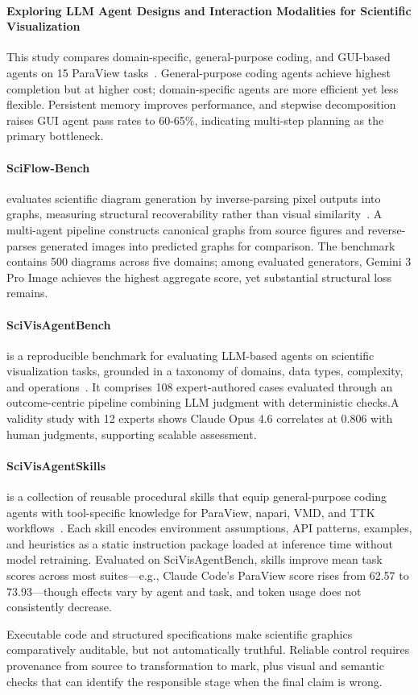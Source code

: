 \paragraph{Exploring LLM Agent Designs and Interaction Modalities for Scientific Visualization}
This study compares domain-specific, general-purpose coding, and GUI-based agents on 15 ParaView tasks~\cite{avg260427996}. General-purpose coding agents achieve highest completion but at higher cost; domain-specific agents are more efficient yet less flexible. Persistent memory improves performance, and stepwise decomposition raises GUI agent pass rates to 60-65\%, indicating multi-step planning as the primary bottleneck.

\paragraph{SciFlow-Bench}
 evaluates scientific diagram generation by inverse-parsing pixel outputs into graphs, measuring structural recoverability rather than visual similarity~\cite{avg260209809}. A multi-agent pipeline constructs canonical graphs from source figures and reverse-parses generated images into predicted graphs for comparison. The benchmark contains 500 diagrams across five domains; among evaluated generators, Gemini 3 Pro Image achieves the highest aggregate score, yet substantial structural loss remains.

\paragraph{SciVisAgentBench}
 is a reproducible benchmark for evaluating LLM-based agents on scientific visualization tasks, grounded in a taxonomy of domains, data types, complexity, and operations~\cite{avg260329139}. It comprises 108 expert-authored cases evaluated through an outcome-centric pipeline combining LLM judgment with deterministic checks.A validity study with 12 experts shows Claude Opus 4.6 correlates at 0.806 with human judgments, supporting scalable assessment.

\paragraph{SciVisAgentSkills}
 is a collection of reusable procedural skills that equip general-purpose coding agents with tool-specific knowledge for ParaView, napari, VMD, and TTK workflows~\cite{avg260605525}. Each skill encodes environment assumptions, API patterns, examples, and heuristics as a static instruction package loaded at inference time without model retraining. Evaluated on SciVisAgentBench, skills improve mean task scores across most suites—e.g., Claude Code's ParaView score rises from 62.57 to 73.93—though effects vary by agent and task, and token usage does not consistently decrease.

Executable code and structured specifications make scientific graphics comparatively auditable, but not automatically truthful. Reliable control requires provenance from source to transformation to mark, plus visual and semantic checks that can identify the responsible stage when the final claim is wrong.

\FloatBarrier

